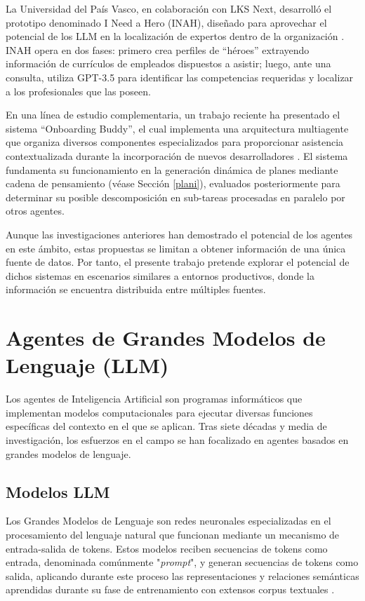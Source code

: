La Universidad del País Vasco, en colaboración con LKS Next, desarrolló el prototipo denominado I Need a Hero (INAH), diseñado para aprovechar el potencial de los LLM en la localización de expertos dentro de la organización \cite{azanza_can_2024}. INAH opera en dos fases: primero crea perfiles de ``héroes'' extrayendo información de currículos de empleados dispuestos a asistir; luego, ante una consulta, utiliza GPT-3.5 para identificar las competencias requeridas y localizar a los profesionales que las poseen.

En una línea de estudio complementaria, un trabajo reciente ha presentado el sistema ``Onboarding Buddy'', el cual implementa una arquitectura multiagente que organiza diversos componentes especializados para proporcionar asistencia contextualizada durante la incorporación de nuevos desarrolladores \cite{cristian_ionescu_multi-agent_2025}. El sistema fundamenta su funcionamiento en la generación dinámica de planes mediante cadena de pensamiento (véase Sección \ref{plani}), evaluados posteriormente para determinar su posible descomposición en sub-tareas procesadas en paralelo por otros agentes.

Aunque las investigaciones anteriores han demostrado el potencial de los agentes en este ámbito, estas propuestas se limitan a obtener información de una única fuente de datos. Por tanto, el presente trabajo pretende explorar el potencial de dichos sistemas en escenarios similares a entornos productivos, donde la información se encuentra distribuida entre múltiples fuentes.

\section{Agentes de Grandes Modelos de Lenguaje (LLM)}

Los agentes de Inteligencia Artificial son programas informáticos que implementan modelos computacionales para ejecutar diversas funciones específicas del contexto en el que se aplican. Tras siete décadas y media de investigación, los esfuerzos en el campo se han focalizado en agentes basados en grandes modelos de lenguaje. 

\subsection{Modelos LLM}

Los Grandes Modelos de Lenguaje son redes neuronales especializadas en el procesamiento del lenguaje natural que funcionan mediante un mecanismo de entrada-salida de tokens. Estos modelos reciben secuencias de tokens como entrada, denominada comúnmente "\textit{prompt}", y generan secuencias de tokens como salida, aplicando durante este proceso las representaciones y relaciones semánticas aprendidas durante su fase de entrenamiento con extensos corpus textuales  \cite{vaswani_attention_2017}.

